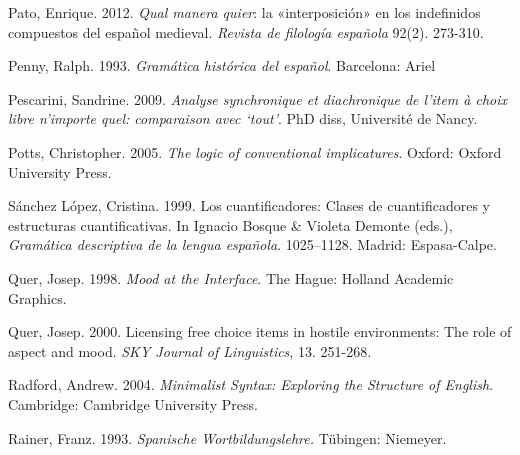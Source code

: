 \begin{styleStandard}
Pato, Enrique. 2012. \textit{Qual manera quier}: la «interposición» en los indefinidos compuestos del español medieval. \textit{Revista de filología española} 92(2). 273-310.
\end{styleStandard}

\begin{styleStandard}
Penny, Ralph. 1993. \textit{Gramática histórica del español}. Barcelona: Ariel
\end{styleStandard}

\begin{styleStandard}
Pescarini, Sandrine. 2009. \textit{Analyse synchronique et diachronique de l'item à choix libre n'importe quel: comparaison avec ‘tout’}. PhD diss, Université de Nancy.
\end{styleStandard}

\begin{styleLiteraturStandard}
Potts, Christopher. 2005. \textit{The logic of conventional implicatures}. Oxford: Oxford University Press.
\end{styleLiteraturStandard}

\begin{styleStandard}
Sánchez López, Cristina. 1999. Los cuantificadores: Clases de cuantificadores y estructuras cuantificativas. In Ignacio Bosque \& Violeta Demonte (eds.), \textit{Gramática descriptiva de la lengua española}. 1025–1128. Madrid: Espasa-Calpe.
\end{styleStandard}

\begin{styleStandard}
Quer, Josep. 1998. \textit{Mood at the Interface}. The Hague: Holland Academic Graphics.
\end{styleStandard}

\begin{styleStandard}
Quer, Josep. 2000. Licensing free choice items in hostile environments: The role of aspect and mood. \textit{SKY Journal of Linguistics}, 13. 251-268.
\end{styleStandard}

\begin{styleStandard}
Radford, Andrew. 2004. \textit{Minimalist Syntax: Exploring the Structure of English}. Cambridge: Cambridge University Press.
\end{styleStandard}

\begin{styleStandard}
Rainer, Franz. 1993. \textit{Spanische Wortbildungslehre.} Tübingen: Niemeyer.
\end{styleStandard}

